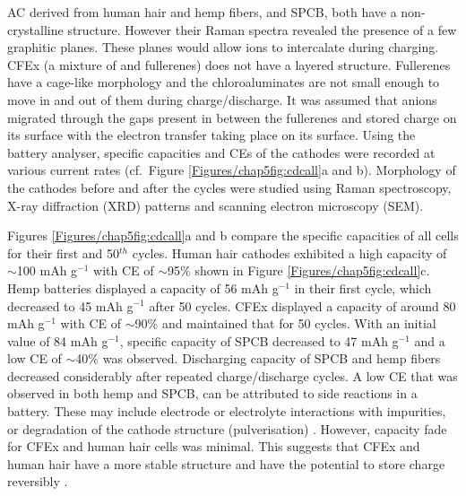 AC derived from human hair and hemp fibers, and SPCB, both have a non-crystalline structure. However their Raman spectra revealed the presence of a few graphitic planes. These planes would allow  ions to intercalate during charging. CFEx (a mixture of  and  fullerenes) does not have a layered structure. Fullerenes have a cage-like morphology and the chloroaluminates are not small enough to move in and out of them during charge/discharge. It was assumed that  anions migrated through the gaps present in between the fullerenes and stored charge on its surface with the electron transfer taking place on its surface. Using the battery analyser, specific capacities and CEs of the cathodes were recorded at various current rates (cf.\ Figure \ref{Figures/chap5fig:cdcall}a and b). Morphology of the cathodes before and after the cycles were studied using Raman spectroscopy, X-ray diffraction (XRD) patterns and scanning electron microscopy (SEM).

Figures \ref{Figures/chap5fig:cdcall}a and b compare the specific capacities of all cells for their first and 50$^{th}$ cycles. Human hair cathodes exhibited a high capacity of $\sim$100 mAh g$^{-1}$ with CE of $\sim$95$\%$ shown in Figure \ref{Figures/chap5fig:cdcall}c. Hemp batteries displayed a capacity of 56 mAh g$^{-1}$ in their first cycle, which decreased to 45 mAh g$^{-1}$ after 50 cycles. CFEx displayed a capacity of around 80 mAh g$^{-1}$ with CE of $\sim$90\% and maintained that for 50 cycles. With an initial value of 84 mAh g$^{-1}$, specific capacity of SPCB decreased to 47 mAh g$^{-1}$ and a low CE of $\sim$40\% was observed. Discharging capacity of SPCB and hemp fibers decreased considerably after repeated charge/discharge cycles. A low CE that was observed in both hemp and SPCB, can be attributed to side reactions in a battery. These may include electrode or electrolyte interactions with impurities, or degradation of the cathode structure (pulverisation) \cite{gyenes_understanding_2015}. However, capacity fade for CFEx and human hair cells was minimal. This suggests that CFEx and human hair have a more stable structure and have the potential to store charge reversibly \cite{pramanick_human_2016}.\\


